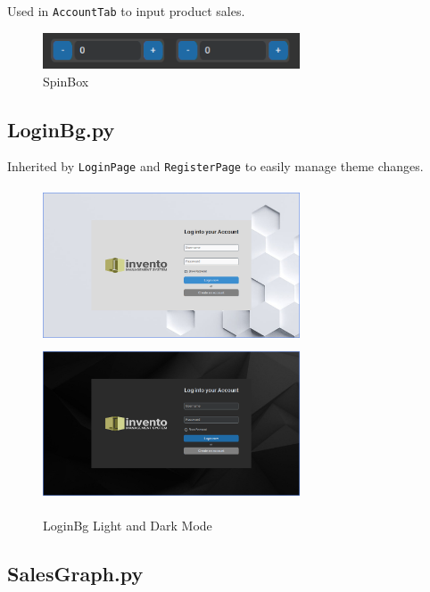 \documentclass[12pt,a4paper]{article}
\renewcommand{\indent}{\hspace\parindent}
\begin{document}
            \indent Used in \texttt{AccountTab} to input product sales.

            \begin{figure}[ht]
              \centering
              \includegraphics[width=3in,height=.4in]{spinbox.png}
              \caption{SpinBox}
              \label{fig:spinbox}
            \end{figure}

        \subsection*{\normalfont{\faCode{}} \textbf{LoginBg.py}}

            \indent Inherited by \texttt{LoginPage} and \texttt{RegisterPage} 
            to easily manage theme changes. 

            \begin{figure}[ht]
              \centering
              \includegraphics[width=3in,height=1.8in]{lightLogin.png}
              \includegraphics[width=3in,height=1.8in]{Login.png}
              \caption{LoginBg Light and Dark Mode}
              \label{fig:loginbg}
            \end{figure}

        \subsection*{\normalfont{\faCode{}} \textbf{SalesGraph.py}}
\end{document}
